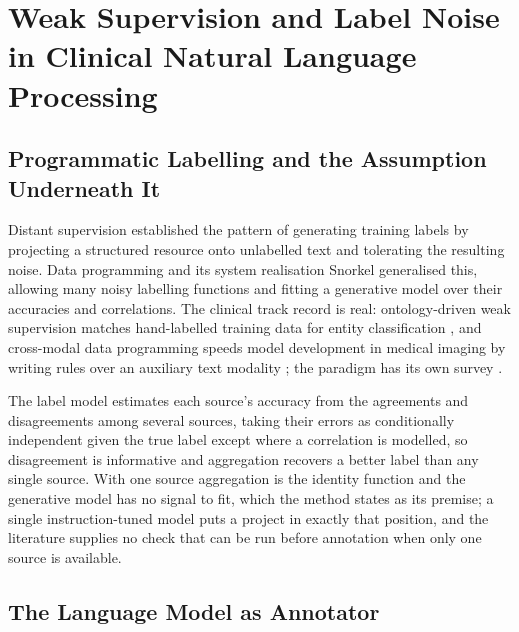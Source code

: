 \section{Weak Supervision and Label Noise in Clinical Natural Language Processing}
\label{sec:lit-weak}

\subsection{Programmatic Labelling and the Assumption Underneath It}

Distant supervision \citep{mintz2009distant} established the pattern of generating training labels
by projecting a structured resource onto unlabelled text and tolerating the resulting noise. Data
programming \citep{ratner2016dataprogramming} and its system realisation Snorkel
\citep{ratner2017snorkel} generalised this, allowing many noisy labelling functions and fitting a
generative model over their accuracies and correlations. The clinical track record is real:
ontology-driven weak supervision matches hand-labelled training data for entity classification
\citep{fries2021trove}, and cross-modal data programming speeds model development in medical imaging
by writing rules over an auxiliary text modality \citep{dunnmon2020crossmodal}; the
paradigm has its own survey \citep{zhang2022wssurvey}.

The label model estimates each source's accuracy from the agreements and disagreements among several sources, taking their errors as conditionally independent given the true label except where a correlation is modelled, so disagreement is informative and aggregation recovers a better label than any single source. With one source aggregation is the identity function and the generative model has no signal
to fit, which the method states as its premise; a single instruction-tuned model
puts a project in exactly that position, and the literature supplies no check that
can be run before annotation when only one source is available.

\subsection{The Language Model as Annotator}

